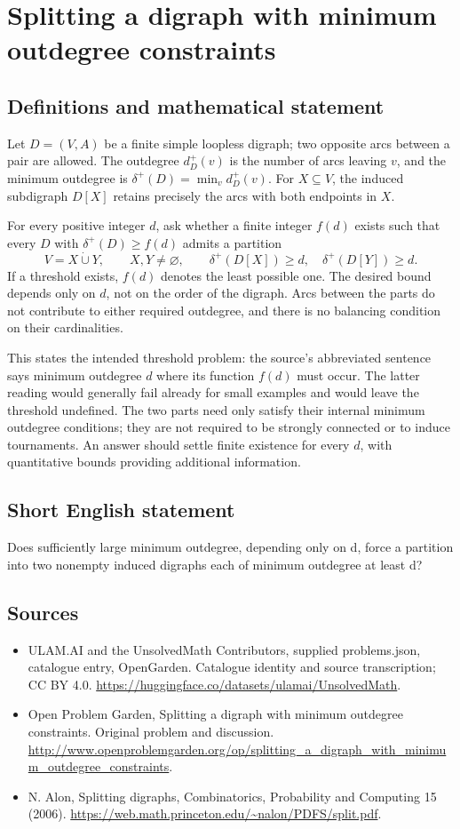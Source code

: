 \documentclass[11pt,a4paper]{article}
\begin{document}
\section*{Splitting a digraph with minimum outdegree constraints}\label{statement}

\subsection{Definitions and mathematical statement}
Let $D=(V,A)$ be a finite simple loopless digraph; two opposite arcs between a pair are allowed. The outdegree $d_D^+(v)$ is the number of arcs leaving $v$, and the minimum outdegree is $\delta^+(D)=\min_vd_D^+(v)$. For $X\subseteq V$, the induced subdigraph $D[X]$ retains precisely the arcs with both endpoints in $X$.

For every positive integer $d$, ask whether a finite integer $f(d)$ exists such that every $D$ with $\delta^+(D)\ge f(d)$ admits a partition
\[
 V=X\mathbin{\dot\cup}Y,\qquad X,Y\ne\varnothing,
 \qquad\delta^+(D[X])\ge d,\quad\delta^+(D[Y])\ge d.
\]
If a threshold exists, $f(d)$ denotes the least possible one. The desired bound depends only on $d$, not on the order of the digraph. Arcs between the parts do not contribute to either required outdegree, and there is no balancing condition on their cardinalities.

This states the intended threshold problem: the source’s abbreviated sentence says minimum outdegree $d$ where its function $f(d)$ must occur. The latter reading would generally fail already for small examples and would leave the threshold undefined. The two parts need only satisfy their internal minimum outdegree conditions; they are not required to be strongly connected or to induce tournaments. An answer should settle finite existence for every $d$, with quantitative bounds providing additional information.
\subsection{Short English statement}
Does sufficiently large minimum outdegree, depending only on d, force a partition into two nonempty induced digraphs each of minimum outdegree at least d?
\subsection{Sources}
\begin{itemize}
\item[S1] ULAM.AI and the UnsolvedMath Contributors, supplied problems.json, catalogue entry, OpenGarden. Catalogue identity and source transcription; CC BY 4.0.
\url{https://huggingface.co/datasets/ulamai/UnsolvedMath}.
\item[S2] Open Problem Garden, Splitting a digraph with minimum outdegree constraints. Original problem and discussion.
\url{http://www.openproblemgarden.org/op/splitting_a_digraph_with_minimum_outdegree_constraints}.
\item[S3] N. Alon, Splitting digraphs, Combinatorics, Probability and Computing 15 (2006).
\url{https://web.math.princeton.edu/~nalon/PDFS/split.pdf}.
\end{itemize}
\end{document}
